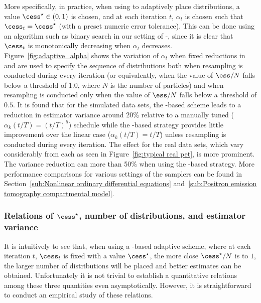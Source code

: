 More specifically, in practice, when using \cess to adaptively place
distributions, a value $\cess^\star \in (0, 1)$ is chosen, and at each
iteration $t$, $\alpha_t$ is chosen such that $\cess_t = \cess^\star$ (with a
preset numeric error tolerance). This can be done using an algorithm such as
binary search in our setting of \smc[1]-\smc[3], since it is clear that
$\cess_t$ is monotonically decreasing when $\alpha_t$ decreases.
Figure~\ref{fig:adaptive_alpha} shows the variation of $\alpha_t$ when fixed
reductions in \ess and \cess are used to specify the sequence of distributions
both when resampling is conducted during every iteration (or equivalently,
when the value of $\ess/N$ falls below a threshold of $1.0$, where $N$ is the
number of particles) and when resampling is conducted only when the value of
$\ess/N$ falls below a threshold of $0.5$. It is found that for the simulated
\pet data sets, the \cess-based scheme leads to a reduction in estimator
variance around 20\% relative to a manually tuned ($\alpha_k(t/T) = (t/T)^5$)
schedule while the \ess-based strategy provides little improvement over the
linear case ($\alpha_k(t/T) = t/T$) unless resampling is conducted during
every iteration. The effect for the real data sets, which vary considerably
from each as seen in Figure~\ref{fig:typical real pet}, is more prominent. The
variance reduction can more than 50\% when using the \cess-based strategy.
More performance comparisons for various settings of the samplers can be found
in Section~\ref{sub:Nonlinear ordinary differential equations}
and~\ref{sub:Positron emission tomography compartmental model}.

\subsubsection[Relations of cess*, number of distributions, and estimator
variance]
{Relations of $\cess^\star$, number of distributions, and estimator variance}
\label{ssub:Relations of cess*, number of distributions, and estimator
  variance}

It is intuitively to see that, when using a \cess-based adaptive scheme, where
at each iteration $t$, $\cess_t$ is fixed with a value $\cess^\star$, the more
close $\cess^\star/N$ is to $1$, the larger number of distributions will be placed
and better estimates can be obtained. Unfortunately it is not trivial to
establish a quantitative relations among these three quantities even
asymptotically. However, it is straightforward to conduct an empirical study
of these relations.

